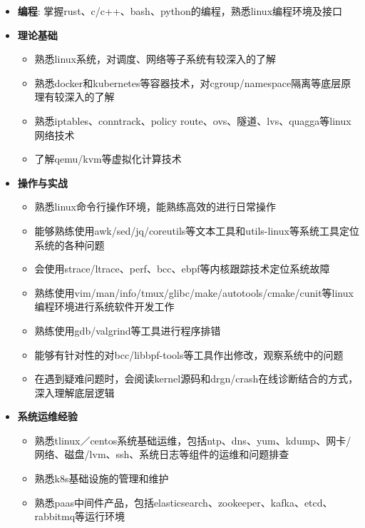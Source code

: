 \begin{itemize}[parsep=0.2ex]
  \item \textbf{编程}: 掌握rust、c/c++、bash、python的编程，熟悉linux编程环境及接口
  \item \textbf{理论基础}
    \begin{itemize}
      \item 熟悉linux系统，对调度、网络等子系统有较深入的了解
      \item 熟悉docker和kubernetes等容器技术，对cgroup/namespace隔离等底层原理有较深入的了解
      \item 熟悉iptables、conntrack、policy route、ovs、隧道、lvs、quagga等linux网络技术
      \item 了解qemu/kvm等虚拟化计算技术
    \end{itemize}
  \item \textbf{操作与实战}
    \begin{itemize}
      \item 熟悉linux命令行操作环境，能熟练高效的进行日常操作
      \item 能够熟练使用awk/sed/jq/coreutils等文本工具和utils-linux等系统工具定位系统的各种问题
      \item 会使用strace/ltrace、perf、bcc、ebpf等内核跟踪技术定位系统故障
      \item 熟练使用vim/man/info/tmux/glibc/make/autotools/cmake/cunit等linux编程环境进行系统软件开发工作
      \item 熟练使用gdb/valgrind等工具进行程序排错
      \item 能够有针对性的对bcc/libbpf-tools等工具作出修改，观察系统中的问题
      \item 在遇到疑难问题时，会阅读kernel源码和drgn/crash在线诊断结合的方式，深入理解底层逻辑
    \end{itemize}
  \item \textbf{系统运维经验}
    \begin{itemize}
      \item 熟悉tlinux／centos系统基础运维，包括ntp、dns、yum、kdump、网卡/网络、磁盘/lvm、ssh、系统日志等组件的运维和问题排查
      \item 熟悉k8s基础设施的管理和维护
      \item 熟悉paas中间件产品，包括elasticsearch、zookeeper、kafka、etcd、rabbitmq等运行环境
    \end{itemize}
\end{itemize}
